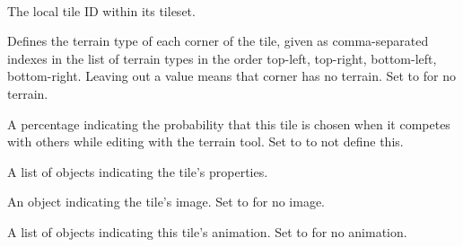 \documentclass[letterpaper,10pt,english]{sphinxmanual}
\begin{document}
\begin{fulllineitems}
\label{index:tmx.Tile}~

\begin{fulllineitems}
\label{index:tmx.Tile.id}
The local tile ID within its tileset.

\end{fulllineitems}


\begin{fulllineitems}
\label{index:tmx.Tile.terrain}
Defines the terrain type of each corner of the tile, given as
comma-separated indexes in the list of terrain types in the order
top-left, top-right, bottom-left, bottom-right.  Leaving out a
value means that corner has no terrain. Set to  for
no terrain.

\end{fulllineitems}


\begin{fulllineitems}
\label{index:tmx.Tile.probability}
A percentage indicating the probability that this tile is chosen
when it competes with others while editing with the terrain tool.
Set to  to not define this.

\end{fulllineitems}


\begin{fulllineitems}
\label{index:tmx.Tile.properties}
A list of {\hyperref[index:tmx.Property]{\emph{}}} objects indicating the tile's
properties.

\end{fulllineitems}


\begin{fulllineitems}
\label{index:tmx.Tile.image}
An {\hyperref[index:tmx.Image]{\emph{}}} object indicating the tile's image.  Set to
 for no image.

\end{fulllineitems}


\begin{fulllineitems}
\label{index:tmx.Tile.animation}
A list of  objects indicating this tile's animation.
Set to  for no animation.

\end{fulllineitems}


\end{fulllineitems}
\end{document}
